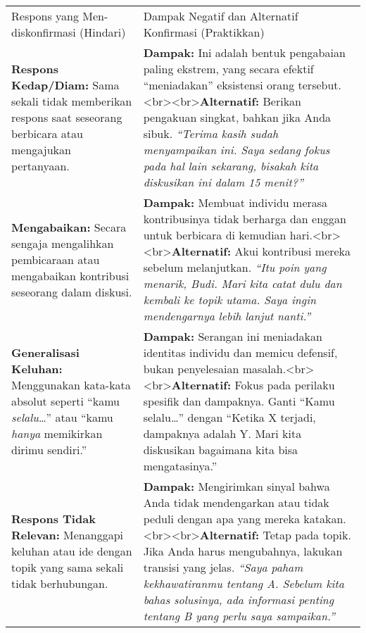 \documentclass[
  letterpaper,
  DIV=11,
  numbers=noendperiod]{scrreprt}
\begin{document}
\begin{longtable}[]{@{}
  >{\raggedright\arraybackslash}p{}
  >{\raggedright\arraybackslash}p{}@{}}
\toprule\noalign{}
\endhead
\bottomrule\noalign{}
\endlastfoot
Respons yang Men-diskonfirmasi (Hindari) & Dampak Negatif dan Alternatif
Konfirmasi (Praktikkan) \\
\textbf{Respons Kedap/Diam:} Sama sekali tidak memberikan respons saat
seseorang berbicara atau mengajukan pertanyaan. & \textbf{Dampak:} Ini
adalah bentuk pengabaian paling ekstrem, yang secara efektif
``meniadakan'' eksistensi orang
tersebut.\textless br\textgreater\textless br\textgreater{}\textbf{Alternatif:}
Berikan pengakuan singkat, bahkan jika Anda sibuk. \emph{``Terima kasih
sudah menyampaikan ini. Saya sedang fokus pada hal lain sekarang,
bisakah kita diskusikan ini dalam 15 menit?''} \\
\textbf{Mengabaikan:} Secara sengaja mengalihkan pembicaraan atau
mengabaikan kontribusi seseorang dalam diskusi. & \textbf{Dampak:}
Membuat individu merasa kontribusinya tidak berharga dan enggan untuk
berbicara di kemudian
hari.\textless br\textgreater\textless br\textgreater{}\textbf{Alternatif:}
Akui kontribusi mereka sebelum melanjutkan. \emph{``Itu poin yang
menarik, Budi. Mari kita catat dulu dan kembali ke topik utama. Saya
ingin mendengarnya lebih lanjut nanti.''} \\
\textbf{Generalisasi Keluhan:} Menggunakan kata-kata absolut seperti
``kamu \emph{selalu}\ldots{}'' atau ``kamu \emph{hanya} memikirkan
dirimu sendiri.'' & \textbf{Dampak:} Serangan ini meniadakan identitas
individu dan memicu defensif, bukan penyelesaian
masalah.\textless br\textgreater\textless br\textgreater{}\textbf{Alternatif:}
Fokus pada perilaku spesifik dan dampaknya. Ganti ``Kamu
selalu\ldots{}'' dengan ``Ketika X terjadi, dampaknya adalah Y. Mari
kita diskusikan bagaimana kita bisa mengatasinya.'' \\
\textbf{Respons Tidak Relevan:} Menanggapi keluhan atau ide dengan topik
yang sama sekali tidak berhubungan. & \textbf{Dampak:} Mengirimkan
sinyal bahwa Anda tidak mendengarkan atau tidak peduli dengan apa yang
mereka
katakan.\textless br\textgreater\textless br\textgreater{}\textbf{Alternatif:}
Tetap pada topik. Jika Anda harus mengubahnya, lakukan transisi yang
jelas. \emph{``Saya paham kekhawatiranmu tentang A. Sebelum kita bahas
solusinya, ada informasi penting tentang B yang perlu saya
sampaikan.''} \\

\end{longtable}
\end{document}

